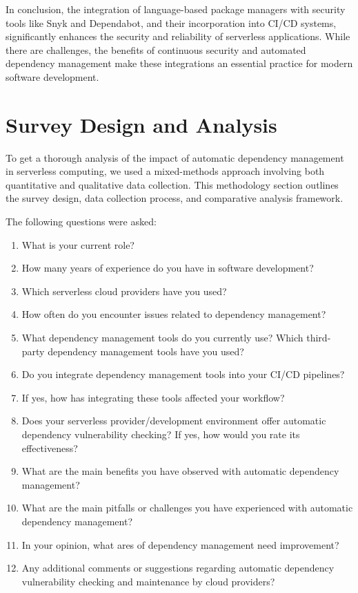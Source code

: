 \documentclass[sigconf]{acmart}
\begin{document}
In conclusion, the integration of language-based package managers with security tools like Snyk and Dependabot, and their incorporation into CI/CD systems, significantly enhances the security and reliability of serverless applications. While there are challenges, the benefits of continuous security and automated dependency management make these integrations an essential practice for modern software development.

\section{Survey Design and Analysis}

To get a thorough analysis of the impact of automatic dependency management in serverless computing, we used a mixed-methods approach involving both quantitative and qualitative data collection. This methodology section outlines the survey design, data collection process, and comparative analysis framework.

The following questions were asked:

\begin{enumerate}
	\item What is your current role?
	\item How many years of experience do you have in software development?
	\item Which serverless cloud providers have you used?
	\item How often do you encounter issues related to dependency management?
	\item What dependency management tools do you currently use? Which third-party dependency management tools have you used?
	\item Do you integrate dependency management tools into your CI/CD pipelines?
	\item If yes, how has integrating these tools affected your workflow?
	\item Does your serverless provider/development environment offer automatic dependency vulnerability checking? If yes, how would you rate its effectiveness?
	\item What are the main benefits you have observed with automatic dependency management?
	\item What are the main pitfalls or challenges you have experienced with automatic dependency management?
	\item In your opinion, what ares of dependency management need improvement?
	\item Any additional comments or suggestions regarding automatic dependency vulnerability checking and maintenance by cloud providers?
\end{enumerate}
\end{document}
